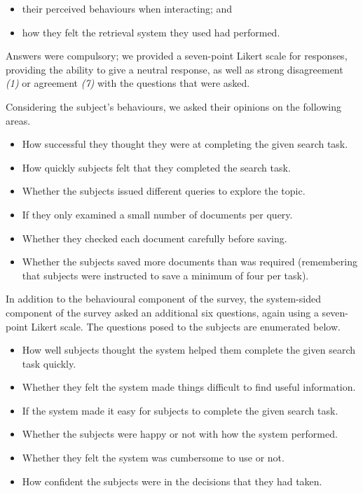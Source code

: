 \begin{itemize}
    \item{their perceived behaviours when interacting; and}
    \item{how they felt the retrieval system they used had performed.}
\end{itemize}

Answers were compulsory; we provided a seven-point Likert scale for responses, providing the ability to give a neutral response, as well as strong disagreement \emph{(1)} or agreement \emph{(7)} with the questions that were asked.

Considering the subject's behaviours, we asked their opinions on the following areas.

\begin{itemize}
    \item{ How successful they thought they were at completing the given search task.}
    \item{ How quickly subjects felt that they completed the search task.}
    \item{ Whether the subjects issued different queries to explore the topic.}
    \item{ If they only examined a small number of documents per query.}
    \item{ Whether they checked each document carefully before saving.}
    \item{ Whether the subjects saved more documents than was required (remembering that subjects were instructed to save a minimum of four per task).}
\end{itemize}

In addition to the behavioural component of the survey, the system-sided component of the survey asked an additional six questions, again using a seven-point Likert scale. The questions posed to the subjects are enumerated below.

\begin{itemize}
    \item{ How well subjects thought the system helped them complete the given search task quickly.}
    \item{ Whether they felt the system made things difficult to find useful information.}
    \item{ If the system made it easy for subjects to complete the given search task.}
    \item{ Whether the subjects were happy or not with how the system performed.}
    \item{ Whether they felt the system was cumbersome to use or not.}
    \item{ How confident the subjects were in the decisions that they had taken.}
\end{itemize}

